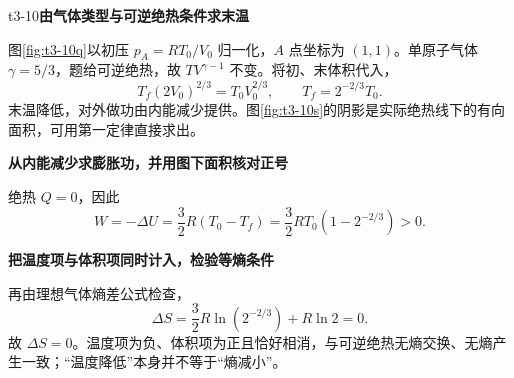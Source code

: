 \LectureAnswerSection

\begin{drillsolution}{t3-10}\textbf{由气体类型与可逆绝热条件求末温}\par\nobreak
图\ref{fig:t3-10q}以初压 $p_A=RT_0/V_0$ 归一化，$A$ 点坐标为 $(1,1)$。单原子气体 $\gamma=5/3$，题给可逆绝热，故 $TV^{\gamma-1}$ 不变。将初、末体积代入，
\[T_f(2V_0)^{2/3}=T_0V_0^{2/3},\qquad \boxed{T_f=2^{-2/3}T_0}.\]
末温降低，对外做功由内能减少提供。图\ref{fig:t3-10s}的阴影是实际绝热线下的有向面积，可用第一定律直接求出。



\par\medskip{}\noindent\textbf{从内能减少求膨胀功，并用图下面积核对正号}\par\nobreak
绝热 $Q=0$，因此
\[\boxed{W=-\Delta U=\frac32R(T_0-T_f)=\frac32RT_0(1-2^{-2/3})>0}.\]


\par\medskip{}\noindent\textbf{把温度项与体积项同时计入，检验等熵条件}\par\nobreak
再由理想气体熵差公式检查，
\[\Delta S=\frac32R\ln(2^{-2/3})+R\ln2=0.\]
故 $\boxed{\Delta S=0}$。温度项为负、体积项为正且恰好相消，与可逆绝热无熵交换、无熵产生一致；“温度降低”本身并不等于“熵减小”。
\end{drillsolution}
